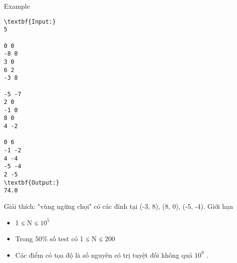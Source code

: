 Example
\begin{verbatim}
\textbf{Input:}
5

0 0
-8 0
3 0
6 2
-3 8

-5 -7
2 0
-1 0
8 0
4 -2

0 6
-1 -2
4 -4
-5 -4
2 -5
\textbf{Output:}
74.0\end{verbatim}

Giải thích: "vùng ngừng chọi" có các đỉnh tại (-3, 8), (8, 0), (-5, -4).
Giới hạn
\begin{itemize}
	\item     1 ≤ N ≤ $10^{5}$
	\item     Trong 50\% số test có 1 ≤ N ≤ 200   
	\item     Các điểm có tọa độ là số nguyên có trị tuyệt đối không quá $10^{9}$    .   
\end{itemize}